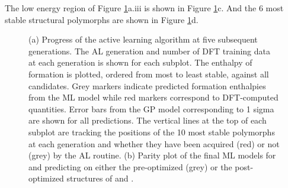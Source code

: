 %
The low energy region of Figure \ref{fig:iro2_al}a.iii is shown in Figure \ref{fig:iro2_al}c.
%
And the \num{6} most stable structural polymorphs are shown in Figure \ref{fig:iro2_al}d. 


\begin{figure}[!htb]
\centering
{}
\caption{\label{fig:iro2_al}
(a) Progress of the active learning algorithm at five subsequent generations.
%
The AL generation and number of DFT training data at each generation is shown for each subplot.
%
The enthalpy of formation is plotted, ordered from most to least stable, against all \IrOthree candidates.
%
Grey markers indicate predicted formation enthalpies from the ML model while red markers correspond to DFT-computed quantities.
%
Error bars from the GP model corresponding to 1 sigma are shown for all predictions.
%
The vertical lines at the top of each subplot are tracking the positions of the \num{10} most stable polymorphs at each generation and whether they have been acquired (red) or not (grey) by the AL routine.
(b) Parity plot of the final ML models for \IrOtwo and \IrOthree predicting on either the pre-optimized (grey) or the post-optimized structures of \IrOtwo and \IrOthree.
}
\end{figure}
